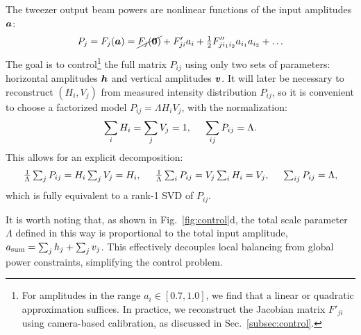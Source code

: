The tweezer output beam powers are nonlinear functions of the input amplitudes $\boldsymbol{a}$:
\begin{equation}
    \label{eq:taylerexp}
    P_j = F_j(\boldsymbol{a}) = \cancel{F_j(\boldsymbol{0})} + F'_{ji} a_i + \tfrac{1}{2} F''_{j i_1 i_2} a_{i_1} a_{i_2} + \ldots
\end{equation}
The goal is to control\footnote{
    For amplitudes in the range $a_i \in [0.7, 1.0]$, we find that a linear or quadratic approximation suffices. In practice, we reconstruct the Jacobian matrix $F'_{ji}$ using camera-based calibration, as discussed in Sec.~\ref{subsec:control}.
} the full matrix $P_{ij}$ using only two sets of parameters: horizontal amplitudes $\boldsymbol{h}$ and vertical amplitudes $\boldsymbol{v}$. 
It will later be necessary to reconstruct $(H_i, V_j)$ from measured intensity distribution $P_{ij}$, so it is convenient to choose a factorized model $P_{ij} = \Lambda H_i V_j$, with the normalization:
\begin{equation*}
    \sum_i H_i = \sum_j V_j = 1, \hspace{5 mm} \sum_{ij} P_{ij} = \Lambda.
\end{equation*}
This allows for an explicit decomposition:
\begin{equation}
    \textstyle
    \frac{1}{\Lambda} \sum_j P_{ij} = H_i \sum_j V_j = H_i,
    \hspace{5 mm} 
    \frac{1}{\Lambda} \sum_i P_{ij} = V_j \sum_i H_i = V_j,
    \hspace{5 mm} 
    \sum_{ij} P_{ij} = \Lambda,
    \label{uv-decomposition}
\end{equation}
which is fully equivalent to a rank-1 SVD of $P_{ij}$.

It is worth noting that, as shown in Fig.~\ref{fig:control}d, the total scale parameter $\Lambda$ defined in this way is proportional to the total input amplitude, $a_{\textnormal{sum}} = \sum_j h_j + \sum_j v_j$. This effectively decouples local balancing from global power constraints, simplifying the control problem.



